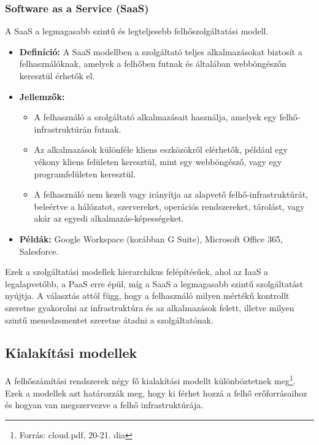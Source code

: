 \documentclass[a4paper,12pt]{article}
\begin{document}
    \subsubsection{Software as a Service (SaaS)}

    A SaaS a legmagasabb szintű és legteljesebb felhőszolgáltatási modell.

    \begin{itemize}
        \item \textbf{Definíció:} A SaaS modellben a szolgáltató teljes alkalmazásokat biztosít a felhasználóknak, amelyek a felhőben futnak és általában webböngészőn keresztül érhetők el.

        \item \textbf{Jellemzők:}
        \begin{itemize}
            \item A felhasználó a szolgáltató alkalmazásait használja, amelyek egy felhő-infrastruktúrán futnak.
            \item Az alkalmazások különféle kliens eszközökről elérhetők, például egy vékony kliens felületen keresztül, mint egy webböngésző, vagy egy programfelületen keresztül.
            \item A felhasználó nem kezeli vagy irányítja az alapvető felhő-infrastruktúrát, beleértve a hálózatot, szervereket, operációs rendszereket, tárolást, vagy akár az egyedi alkalmazás-képességeket.
        \end{itemize}

        \item \textbf{Példák:} Google Workspace (korábban G Suite), Microsoft Office 365, Salesforce.
    \end{itemize}

    Ezek a szolgáltatási modellek hierarchikus felépítésűek, ahol az IaaS a legalapvetőbb, a PaaS erre épül, míg a SaaS a legmagasabb szintű szolgáltatást nyújtja. A választás attól függ, hogy a felhasználó milyen mértékű kontrollt szeretne gyakorolni az infrastruktúra és az alkalmazások felett, illetve milyen szintű menedzsmentet szeretne átadni a szolgáltatónak.

    \subsection{Kialakítási modellek}

    A felhőszámítási rendszerek négy fő kialakítási modellt különböztetnek meg\footnote{Forrás: cloud.pdf, 20-21. dia}. Ezek a modellek azt határozzák meg, hogy ki férhet hozzá a felhő erőforrásaihoz és hogyan van megszervezve a felhő infrastruktúrája.
\end{document}
